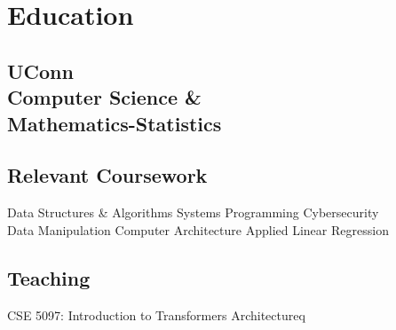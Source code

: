 \documentclass[]{resume-template}
\begin{document}
%
%
    \lastupdated{}

%
%

%
%

    \begin{minipage}[t]{0.33\textwidth}


        \section{Education}\label{sec:education}

        \subsection{UConn\\ Computer Science \&\\
        Mathematics-Statistics}\label{subsec:uconn}
        \vspace{\topsep}

        \subsection{Relevant Coursework}\label{subsec:coursework}
        Data Structures \& Algorithms \textbullet{} Systems Programming \textbullet{} Cybersecurity \textbullet{}\\ Data Manipulation \textbullet{}
        Computer Architecture \textbullet{} Applied Linear Regression
        \sectionsep{}

        \subsection{Teaching}\label{subsec:teaching}
        CSE 5097: Introduction to Transformers Architectureq




\end{minipage}
\end{document}
